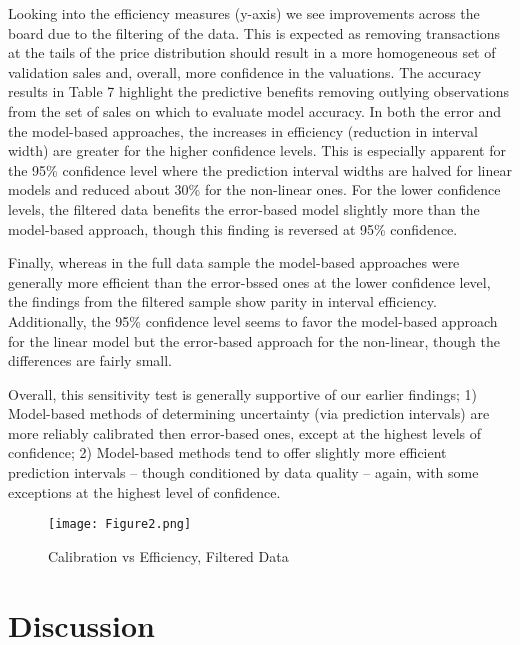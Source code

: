 \documentclass[colTwo]{anon}
\theoremstyle{definition}
\begin{document}
Looking into the efficiency measures (y-axis) we see improvements across the board due to the filtering of the data.  This is expected as removing transactions at the tails of the price distribution should result in a more homogeneous set of validation sales and, overall, more confidence in the valuations.  The accuracy results in Table 7 highlight the predictive benefits removing outlying observations from the set of sales on which to evaluate model accuracy. In both the error and the model-based approaches, the increases in efficiency (reduction in interval width) are greater for the higher confidence levels.  This is especially apparent for the 95\% confidence level where the prediction interval widths are halved for linear models and reduced about 30\% for the non-linear ones.  For the lower confidence levels, the filtered data benefits the error-based model slightly more than the model-based approach, though this finding is reversed at 95\% confidence.  

Finally, whereas in the full data sample the model-based approaches were generally more efficient than the error-bssed ones at the lower confidence level, the findings from the filtered sample show parity in interval efficiency.  Additionally, the 95\% confidence level seems to favor the model-based approach for the linear model but the error-based approach for the non-linear, though the differences are fairly small.  

Overall, this sensitivity test is generally supportive of our earlier findings; 1) Model-based methods of determining uncertainty (via prediction intervals) are more reliably calibrated then error-based ones, except at the highest levels of confidence; 2) Model-based methods tend to offer slightly more efficient prediction intervals -- though conditioned by data quality -- again, with some exceptions at the highest level of confidence.  

\begin{figure*}[h!]
\centering
\texttt{[image: Figure2.png]}
\caption{Calibration vs Efficiency, Filtered Data}
\label{fig:calibsens}
\end{figure*}

\section{Discussion}
\end{document}
